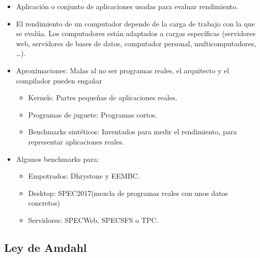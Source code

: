 \documentclass[12pt, twoside, openright]{report} %
\begin{document}
  \begin{itemize}
  
  \item
    Aplicación o conjunto de aplicaciones usadas para evaluar
    rendimiento.
  \item
    El rendimiento de un computador depende de la carga de trabajo con
    la que se evalúa. Los computadores están adaptados a cargas
    específicas (servidores web, servidores de bases de datos,
    computador personal, multicomputadores, \ldots).
  \item
    Aproximaciones: Malas al no ser programas reales, el arquitecto y el
    compilador pueden engañar

    \begin{itemize}
    
    \item
      Kernels: Partes pequeñas de aplicaciones reales.
    \item
      Programas de juguete: Programas cortos.
    \item
      Benchmarks sintéticos: Inventados para medir el rendimiento, para
      representar aplicaciones reales.
    \end{itemize}
  \item
    Algunos benchmarks para:

    \begin{itemize}
    
    \item
      Empotrados: Dhrystone y EEMBC.
    \item
      Desktop: SPEC2017(mezcla de programas reales con unos datos
      concretos)
    \item
      Servidores: SPECWeb, SPECSFS o TPC.
    \end{itemize}
  \end{itemize}

  \subsection{Ley de Amdahl}
\end{document}
